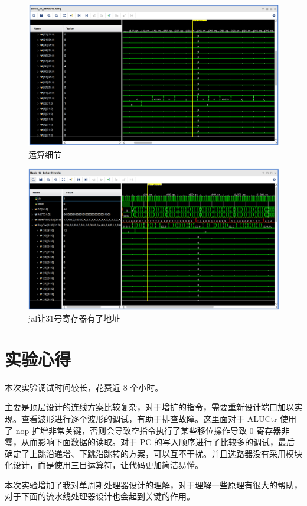 \documentclass[a4paper,UTF8]{ctexart}
\begin{document}
\begin{figure}[H]
    \centering
    \includegraphics[width=\textwidth]{calcdetail.png}
    \caption{运算细节}
    \label{fig:calcde}
\end{figure}

\begin{figure}[H]
    \centering
    \includegraphics[width=\textwidth]{memdetail.png}
    \caption{jal让31号寄存器有了地址}
    \label{fig:cond}
\end{figure}

\section{实验心得}

本次实验调试时间较长，花费近 8 个小时。

主要是顶层设计的连线方案比较复杂，对于增扩的指令，需要重新设计端口加以实现。查看波形进行逐个波形的调试，有助于排查故障。这里面对于 ALUCtr 使用了 nop 扩增非常关键，否则会导致空指令执行了某些移位操作导致 0 寄存器非零，从而影响下面数据的读取。对于 PC 的写入顺序进行了比较多的调试，最后确定了上跳沿递增、下跳沿跳转的方案，可以互不干扰。并且选路器没有采用模块化设计，而是使用三目运算符，让代码更加简洁易懂。

本次实验增加了我对单周期处理器设计的理解，对于理解一些原理有很大的帮助，对于下面的流水线处理器设计也会起到关键的作用。
\end{document}
